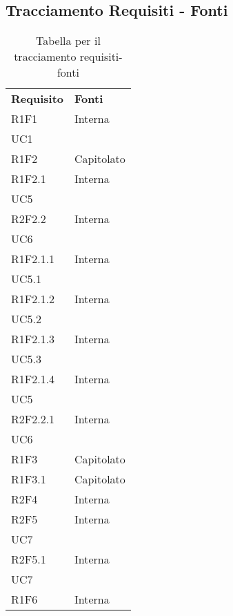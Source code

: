 \subsection{Tracciamento Requisiti - Fonti}

\renewcommand{\arraystretch}{2.2}

\begin{longtable}{|C{6.5cm}|C{6.5cm}|}
	
	\caption{Tabella per il tracciamento requisiti-fonti}\\
	\hline
	
	\textbf{Requisito} & \textbf{Fonti} 
	\tabularnewline
	\endhead
	
	R1F1 & \centering Interna \\ UC1 \tabularnewline
	
	R1F2 & Capitolato \\
	
	R1F2.1 & \centering Interna \\ UC5 \tabularnewline
	
	R2F2.2 & \centering Interna \\ UC6 \tabularnewline
	
	R1F2.1.1 & \centering Interna \\ UC5.1 \tabularnewline
	
	R1F2.1.2 &   \centering Interna \\ UC5.2 \tabularnewline
	
	R1F2.1.3 &  \centering Interna \\ UC5.3 \tabularnewline
	
	R1F2.1.4 &  \centering Interna \\ UC5 \tabularnewline
	
	R2F2.2.1 &  \centering Interna \\ UC6 \tabularnewline
	
	R1F3 & Capitolato \\
	
	R1F3.1 & Capitolato \\	
	
	R2F4 &  Interna \\
	
	R2F5 &  \centering Interna \\ UC7 \tabularnewline
	
	R2F5.1 &  \centering Interna \\ UC7 \tabularnewline
	
	R1F6 & Interna \\
	

\end{longtable}
